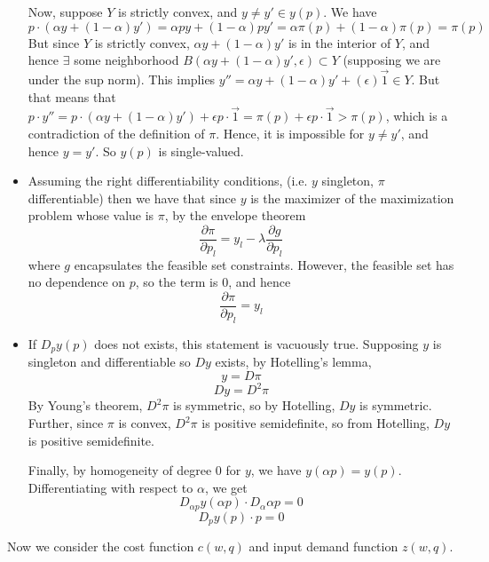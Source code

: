 \documentclass[10pt,letter]{article}
\begin{document}
\begin{itemize}
Now, suppose $Y$ is strictly convex, and $y \neq y' \in y(p)$. We have
\[ p\cdot (\alpha y + (1-\alpha)y') = \alpha py + (1-\alpha)py' = \alpha \pi(p) + (1-\alpha)\pi(p) = \pi(p) \]
But since $Y$ is strictly convex, $\alpha y + (1-\alpha)y'$ is in the interior of $Y$, and hence $\exists$ some neighborhood $B(\alpha y + (1-\alpha)y', \epsilon) \subset Y$ (supposing we are under the sup norm). This implies $y'' = \alpha y + (1-\alpha)y' + (\epsilon)\vec{1} \in Y$. But that means that $p\cdot y'' = p \cdot (\alpha y + (1-\alpha)y') + \epsilon p \cdot \vec{1} = \pi(p) + \epsilon p\cdot \vec{1} > \pi(p)  $, which is a contradiction of the definition of $\pi$. Hence, it is impossible for $y \neq y'$, and hence $y = y'$. So $y(p)$ is single-valued.
\item Assuming the right differentiability conditions, (i.e. $y$ singleton, $\pi$ differentiable) then we have that since $y$ is the maximizer of the maximization problem whose value is $\pi$, by the envelope theorem
\[ \frac{\partial \pi}{\partial p_l} = y_l - \lambda \frac{\partial g}{\partial p_l} \]
where $g$ encapsulates the feasible set constraints. However, the feasible set has no dependence on $p$, so the term is 0, and hence
\[ \frac{\partial \pi}{\partial p_l} = y_l \]
\item If $D_py(p)$ does not exists, this statement is vacuously true. Supposing $y$ is singleton and differentiable so $Dy$ exists, by Hotelling's lemma,
\[ y = D \pi \]
\[ Dy = D^2 \pi \]
By Young's theorem, $D^2 \pi$ is symmetric, so by Hotelling, $Dy$ is symmetric. Further, since $\pi$ is convex, $D^2 \pi$ is positive semidefinite, so from Hotelling, $Dy$ is positive semidefinite.

Finally, by homogeneity of degree 0 for $y$, we have
$y(\alpha p) = y(p)$. Differentiating with respect to $\alpha$, we get
\[ D_{\alpha p} y(\alpha p) \cdot D_\alpha {\alpha p} = 0 \]
\[ D_p y(p) \cdot p = 0 \]
\end{itemize}
Now we consider the cost function $c(w,q)$ and input demand function $z(w, q)$.
\end{document}
